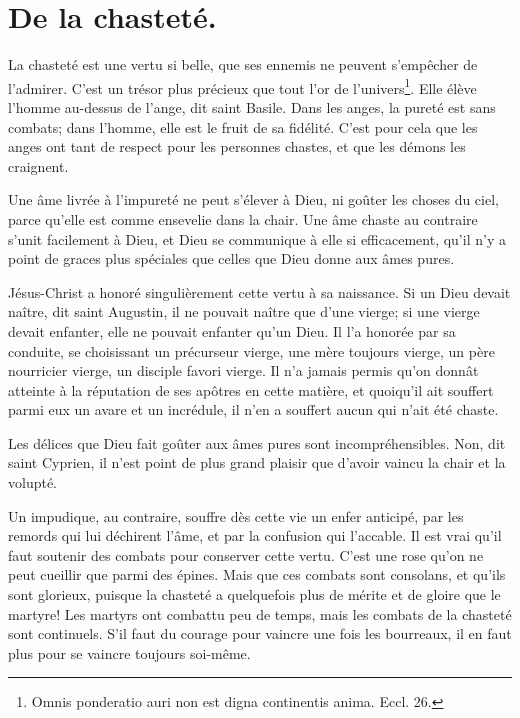 \documentclass[instructions.tex]{subfiles}
\begin{document}
 
\chapter{De la chasteté.}
 
\primo La chasteté est une vertu si belle, que ses ennemis ne peuvent s'empêcher de l'admirer. C'est un trésor plus précieux que tout l'or de l'univers\footnote{Omnis ponderatio auri non est digna continentis anima. Eccl. 26.}. Elle élève l'homme au-dessus de l'ange, dit saint Basile. Dans les anges, la pureté est sans combats; dans l'homme, elle est le fruit de sa fidélité. C'est pour cela que les anges ont tant de respect pour les personnes chastes, et que les démons les craignent.
 
Une âme livrée à l'impureté ne peut s'élever à Dieu, ni goûter les choses du ciel, parce qu'elle est comme ensevelie dans la chair. Une âme chaste au contraire s'unit facilement à Dieu, et Dieu se communique à elle si efficacement, qu'il n'y a point de graces plus spéciales que celles que Dieu donne aux âmes pures.
 
Jésus-Christ a honoré singulièrement cette vertu à sa naissance. Si un Dieu devait naître, dit saint Augustin, il ne pouvait naître que d'une vierge; si une vierge devait enfanter, elle ne pouvait enfanter qu'un Dieu. Il l'a honorée par sa conduite, se choisissant un précurseur vierge, une mère toujours vierge, un père nourricier vierge, un disciple favori vierge. Il n'a jamais permis qu'on donnât atteinte à la réputation de ses apôtres en cette matière, et quoiqu'il ait souffert parmi eux un avare et un incrédule, il n'en a souffert aucun qui n'ait été chaste.
 
\secundo Les délices que Dieu fait goûter aux âmes pures sont incompréhensibles. Non, dit saint Cyprien, il n'est point de plus grand plaisir que d'avoir vaincu la chair et la volupté.
 
Un impudique, au contraire, souffre dès cette vie un enfer anticipé, par les remords qui lui déchirent l'âme, et par la confusion qui l'accable. Il est vrai qu'il faut soutenir des combats pour conserver cette vertu. C'est une rose qu'on ne peut cueillir que parmi des épines. Mais que ces combats sont consolans, et qu'ils sont glorieux, puisque la chasteté a quelquefois plus de mérite et de gloire que le martyre! Les martyrs ont combattu peu de temps, mais les combats de la chasteté sont continuels. S'il faut du courage pour vaincre une fois les bourreaux, il en faut plus pour se vaincre toujours soi-même.
 
\end{document}
